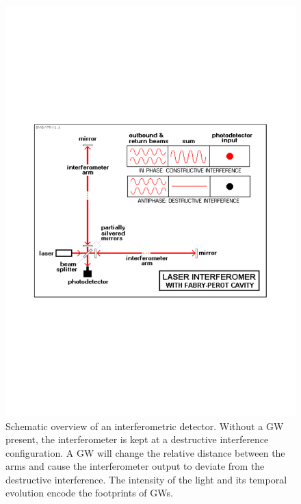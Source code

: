 \documentclass[binding=0.6cm, LaM]{sapthesis}
\begin{document}
\begin{figure}
\includegraphics[scale=0.55]{spot}
\centering
\caption{Schematic overview of an interferometric detector. Without a GW present, the interferometer is kept at a destructive interference configuration.
A GW will change the relative distance between the arms and cause the interferometer output to deviate from the destructive interference.
 The intensity of the light and its temporal evolution encode the footprints of GWs.}
\label{fig:spot}
\end{figure}
\end{document}
